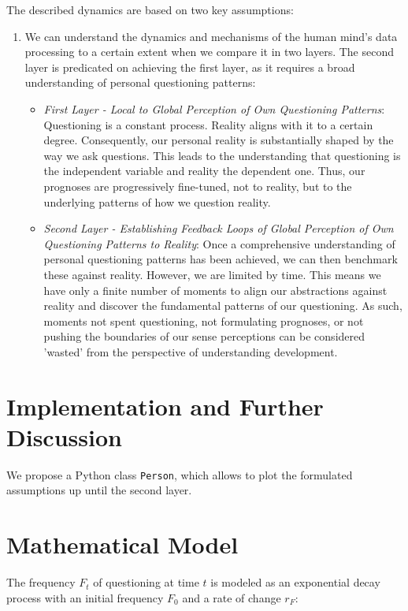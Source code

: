 \documentclass{article}
\begin{document}
    The described dynamics are based on two key assumptions:
    \begin{enumerate}
        \item We can understand the dynamics and mechanisms of the human mind's data processing to a certain extent when we compare it in two layers. The second layer is predicated on achieving the first layer, as it requires a broad understanding of personal questioning patterns:
        \begin{itemize}
            \item \textit{First Layer - Local to Global Perception of Own Questioning Patterns}: Questioning is a constant process. Reality aligns with it to a certain degree. Consequently, our personal reality is substantially shaped by the way we ask questions. This leads to the understanding that questioning is the independent variable and reality the dependent one. Thus, our prognoses are progressively fine-tuned, not to reality, but to the underlying patterns of how we question reality.
            \item \textit{Second Layer - Establishing Feedback Loops of Global Perception of Own Questioning Patterns to Reality}: Once a comprehensive understanding of personal questioning patterns has been achieved, we can then benchmark these against reality. However, we are limited by time. This means we have only a finite number of moments to align our abstractions against reality and discover the fundamental patterns of our questioning. As such, moments not spent questioning, not formulating prognoses, or not pushing the boundaries of our sense perceptions can be considered 'wasted' from the perspective of understanding development.
        \end{itemize}
    \end{enumerate}
    \label{sec:assumptions}


    \section{Implementation and Further Discussion}

    We propose a Python class \texttt{Person}, which allows to plot the formulated assumptions up until the second layer.


    \section{Mathematical Model}

    The frequency $F_t$ of questioning at time $t$ is modeled as an exponential decay process with an initial frequency $F_0$ and a rate of change $r_F$:
\end{document}

